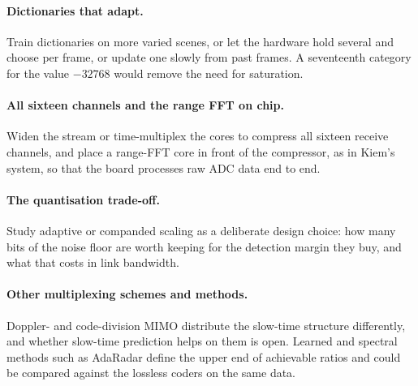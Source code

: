 \paragraph{Dictionaries that adapt.} Train dictionaries on more varied scenes,
or let the hardware hold several and choose per frame, or update one slowly
from past frames. A seventeenth category for the value $-32768$ would remove
the need for saturation.

\paragraph{All sixteen channels and the range FFT on chip.} Widen the stream or
time-multiplex the cores to compress all sixteen receive channels, and place a
range-FFT core in front of the compressor, as in Kiem's system, so that the
board processes raw ADC data end to end.

\paragraph{The quantisation trade-off.} Study adaptive or companded scaling as
a deliberate design choice: how many bits of the noise floor are worth keeping
for the detection margin they buy, and what that costs in link bandwidth.

\paragraph{Other multiplexing schemes and methods.} Doppler- and code-division
MIMO distribute the slow-time structure differently, and whether slow-time
prediction helps on them is open. Learned and spectral methods such as AdaRadar
\cite{park2026} define the upper end of achievable ratios and could be compared
against the lossless coders on the same data.
